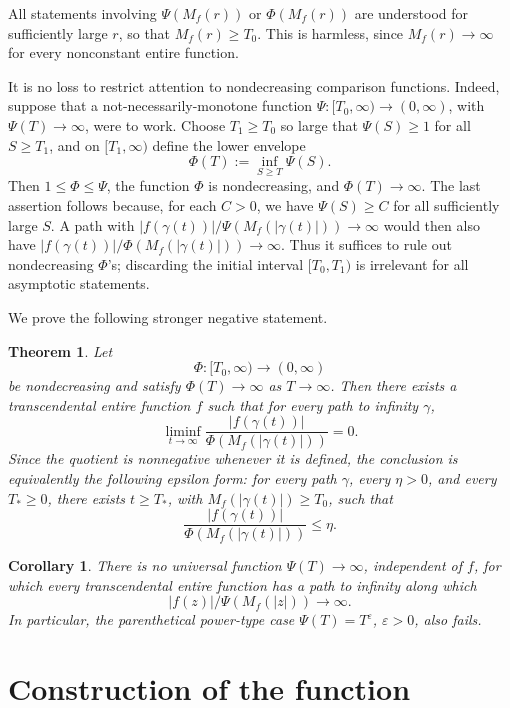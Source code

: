 \documentclass[11pt]{article}
\newtheorem{theorem}{Theorem}
\newtheorem{corollary}{Corollary}
\begin{document}
All statements involving \(\Psi(M_f(r))\) or \(\Phi(M_f(r))\) are understood for
sufficiently large \(r\), so that \(M_f(r)\ge T_0\).  This is harmless, since
\(M_f(r)\to\infty\) for every nonconstant entire function.

It is no loss to restrict attention to nondecreasing comparison functions.
Indeed, suppose that a not-necessarily-monotone function
\(\Psi:[T_0,\infty)\to(0,\infty)\), with \(\Psi(T)\to\infty\), were to work.
Choose \(T_1\ge T_0\) so large that \(\Psi(S)\ge 1\) for all \(S\ge T_1\), and
on \([T_1,\infty)\) define the lower envelope
\[
\Phi(T):=\inf_{S\ge T}\Psi(S).
\]
Then \(1\le\Phi\le\Psi\), the function \(\Phi\) is nondecreasing, and
\(\Phi(T)\to\infty\).  The last assertion follows because, for each \(C>0\),
we have \(\Psi(S)\ge C\) for all sufficiently large \(S\).  A path with
\(|f(\gamma(t))|/\Psi(M_f(|\gamma(t)|))\to\infty\) would then also have
\(|f(\gamma(t))|/\Phi(M_f(|\gamma(t)|))\to\infty\).
Thus it suffices to rule out nondecreasing \(\Phi\)'s; discarding the initial
interval \([T_0,T_1)\) is irrelevant for all asymptotic statements.

We prove the following stronger negative statement.

\begin{theorem}\label{thm:main}
Let
\[
\Phi:[T_0,\infty)\to(0,\infty)
\]
be nondecreasing and satisfy \(\Phi(T)\to\infty\) as \(T\to\infty\).  Then there
exists a transcendental entire function \(f\) such that for every path to
infinity \(\gamma\),
\[
\liminf_{t\to\infty}
\frac{|f(\gamma(t))|}{\Phi(M_f(|\gamma(t)|))}=0.
\]
Since the quotient is nonnegative whenever it is defined, the conclusion is
equivalently the following epsilon form: for every path \(\gamma\), every
\(\eta>0\), and every \(T_\ast\ge 0\), there exists \(t\ge T_\ast\), with
\(M_f(|\gamma(t)|)\ge T_0\), such that
\[
\frac{|f(\gamma(t))|}{\Phi(M_f(|\gamma(t)|))}\le \eta.
\]
\end{theorem}

\begin{corollary}\label{cor:third-question}
There is no universal function \(\Psi(T)\to\infty\), independent of \(f\), for
which every transcendental entire function has a path to infinity along which
\[
|f(z)|/\Psi(M_f(|z|))\to\infty.
\]
In particular, the parenthetical power-type case \(\Psi(T)=T^\varepsilon\),
\(\varepsilon>0\), also fails.
\end{corollary}

\section{Construction of the function}
\end{document}
